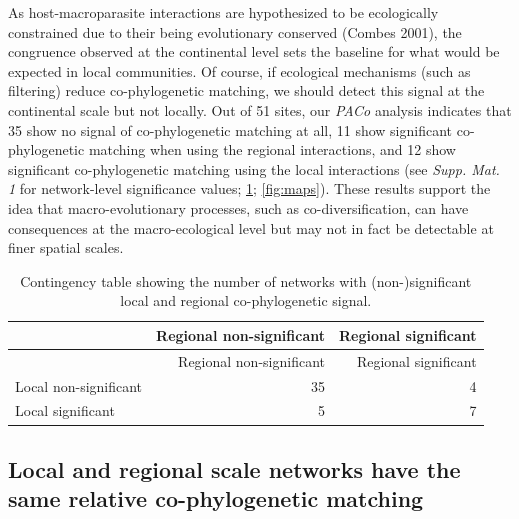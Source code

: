\documentclass[11pt,serif]{article}
\begin{document}
As host-macroparasite interactions are hypothesized to be ecologically
constrained due to their being evolutionary conserved (Combes 2001), the
congruence observed at the continental level sets the baseline for what
would be expected in local communities. Of course, if ecological
mechanisms (such as filtering) reduce co-phylogenetic matching, we
should detect this signal at the continental scale but not locally. Out
of 51 sites, our \emph{PACo} analysis indicates that 35 show no signal
of co-phylogenetic matching at all, 11 show significant co-phylogenetic
matching when using the regional interactions, and 12 show significant
co-phylogenetic matching using the local interactions (see \emph{Supp.
Mat. 1} for network-level significance values;
\cref{tbl:contingency}; \cref{fig:maps}).
These results support the idea that macro-evolutionary processes, such
as co-diversification, can have consequences at the macro-ecological
level but may not in fact be detectable at finer spatial scales.

\begin{longtable}[]{@{}lrr@{}}
\caption{Contingency table showing the number of networks with
(non-)significant local and regional co-phylogenetic signal.
\label{tbl:contingency}}\tabularnewline
\toprule
& Regional non-significant & Regional significant\tabularnewline
\midrule
\endfirsthead
\toprule
& Regional non-significant & Regional significant\tabularnewline
\midrule
\endhead
Local non-significant & 35 & 4\tabularnewline
Local significant & 5 & 7\tabularnewline
\bottomrule
\end{longtable}

\subsection{Local and regional scale networks have the same relative
co-phylogenetic
matching}\label{local-and-regional-scale-networks-have-the-same-relative-co-phylogenetic-matching}
\end{document}
